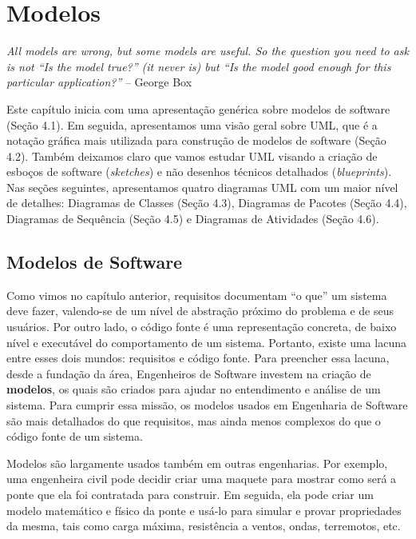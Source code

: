 \documentclass[
  11pt,
  twoside]{book}
\renewenvironment{quote}{\centering \vspace{1.5ex} \begin{tcolorbox}[colback=backcolor, width=4.9in]}{\end{tcolorbox}}
\begin{document}
\hypertarget{modelos}{%
\chapter{Modelos}\label{modelos}}

\begin{quote}
\emph{All models are wrong, but some models are useful. So the question
you need to ask is not ``Is the model true?'' (it never is) but ``Is the
model good enough for this particular application?''} -- George Box
\end{quote}

Este capítulo inicia com uma apresentação genérica sobre modelos de
software (Seção 4.1). Em seguida, apresentamos uma visão geral sobre
UML, que é a notação gráfica mais utilizada para construção de modelos
de software (Seção 4.2). Também deixamos claro que vamos estudar UML
visando a criação de esboços de software (\emph{sketches}) e não
desenhos técnicos detalhados (\emph{blueprints}). Nas seções seguintes,
apresentamos quatro diagramas UML com um maior nível de detalhes:
Diagramas de Classes (Seção 4.3), Diagramas de Pacotes (Seção 4.4),
Diagramas de Sequência (Seção 4.5) e Diagramas de Atividades (Seção
4.6).

\hypertarget{modelos-de-software-1}{%
\section{Modelos de Software}\label{modelos-de-software-1}}


Como vimos no capítulo anterior, requisitos documentam ``o que'' um
sistema deve fazer, valendo-se de um nível de abstração próximo do
problema e de seus usuários. Por outro lado, o código fonte é uma
representação concreta, de baixo nível e executável do comportamento de
um sistema. Portanto, existe uma lacuna entre esses dois mundos:
requisitos e código fonte. Para preencher essa lacuna, desde a fundação
da área, Engenheiros de Software investem na criação de
\textbf{modelos}, os quais são criados para ajudar no entendimento e
análise de um sistema. Para cumprir essa missão, os modelos usados em
Engenharia de Software são mais detalhados do que requisitos, mas ainda
menos complexos do que o código fonte de um sistema.

Modelos são largamente usados também em outras engenharias. Por exemplo,
uma engenheira civil pode decidir criar uma maquete para mostrar como
será a ponte que ela foi contratada para construir. Em seguida, ela pode
criar um modelo matemático e físico da ponte e usá-lo para simular e
provar propriedades da mesma, tais como carga máxima, resistência a
ventos, ondas, terremotos, etc.
\end{document}
